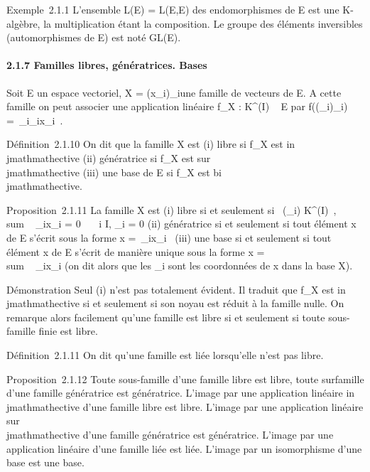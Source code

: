 Exemple~2.1.1 L'ensemble L(E) = L(E,E) des endomorphismes de E est une
K-algèbre, la multiplication étant la composition. Le groupe des
éléments inversibles (automorphismes de E) est noté GL(E).

\paragraph{2.1.7 Familles libres, génératrices. Bases}

Soit E un espace vectoriel, X = (x_i)_i\inI une famille
de vecteurs de E. A cette famille on peut associer une application
linéaire f_X : K^(I) \rightarrow~ E par
f((\alpha_i)_i\inI) =\
\sum  _i\inI\alpha_ix_i~.

Définition~2.1.10 On dit que la famille X est (i) libre si f_X
est in\\jmathmathective (ii) génératrice si f_X est sur\\jmathmathective (iii) une
base de E si f_X est bi\\jmathmathective.

Proposition~2.1.11 La famille X est (i) libre si et seulement si
\forall~(\alpha_i) \in K^(I)~,
\\sum ~
\alpha_ix_i = 0 \rigtharrow~\forall~~i \in I,
\alpha_i = 0 (ii) génératrice si et seulement si tout élément x de E
s'écrit sous la forme x =\
\sum  \alpha_ix_i~ (iii) une base
si et seulement si tout élément x de E s'écrit de manière unique sous la
forme x = \\sum ~
\alpha_ix_i (on dit alors que les \alpha_i sont les
coordonnées de x dans la base X).

Démonstration Seul (i) n'est pas totalement évident. Il traduit que
f_X est in\\jmathmathective si et seulement si son noyau est réduit à la
famille nulle. On remarque alors facilement qu'une famille est libre si
et seulement si toute sous-famille finie est libre.

Définition~2.1.11 On dit qu'une famille est liée lorsqu'elle n'est pas
libre.

Proposition~2.1.12 Toute sous-famille d'une famille libre est libre,
toute surfamille d'une famille génératrice est génératrice. L'image par
une application linéaire in\\jmathmathective d'une famille libre est libre.
L'image par une application linéaire sur\\jmathmathective d'une famille
génératrice est génératrice. L'image par une application linéaire d'une
famille liée est liée. L'image par un isomorphisme d'une base est une
base.

